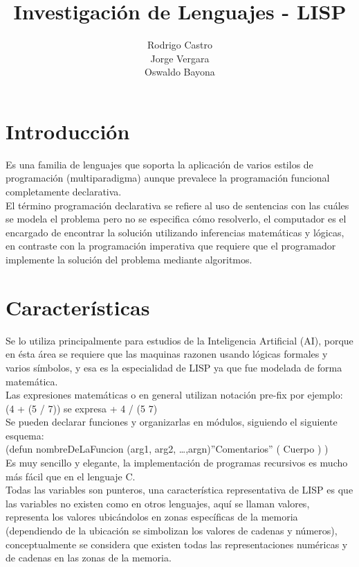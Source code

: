 \documentclass[11pt]{article} %
\title{Investigación de Lenguajes - LISP}
\author{Rodrigo Castro\\Jorge Vergara\\Oswaldo Bayona}
\begin{document}
\maketitle

\section{Introducción}

Es una familia de lenguajes que soporta la aplicación de varios estilos de programación 
(multiparadigma) aunque prevalece la programación funcional completamente declarativa.\\

El término programación declarativa se refiere al uso de sentencias con las cuáles se modela el
problema pero no se especifica cómo resolverlo,  el computador es el encargado de encontrar 
la solución utilizando inferencias matemáticas y lógicas, en contraste con la programación
imperativa que requiere que el programador implemente la  solución del problema mediante
algoritmos.\\

\section{Características}


Se lo utiliza principalmente para estudios de la Inteligencia Artificial (AI), porque en ésta área
se requiere que las maquinas razonen usando lógicas formales y varios símbolos, y esa es la especialidad de LISP
ya que fue modelada de forma matemática.\\


Las expresiones matemáticas o en general utilizan notación pre-fix por ejemplo:\\
(4 + (5 / 7))  se expresa + 4 / (5  7)\\
Se pueden declarar funciones y organizarlas en módulos, siguiendo el siguiente esquema:\\
	(defun nombreDeLaFuncion (arg1, arg2, …,argn)”Comentarios” (  Cuerpo ) )\\
	
Es muy sencillo y elegante, la implementación de programas recursivos es mucho más fácil que en el lenguaje C.\\

Todas las variables son punteros, una característica representativa de LISP es que las variables 
no existen como en otros lenguajes, aquí se llaman valores, representa los valores ubicándolos 
en zonas específicas de la memoria (dependiendo de la ubicación se simbolizan los valores
de cadenas y números), conceptualmente se considera que existen todas las representaciones
numéricas y de cadenas en las zonas de la memoria.\\
\end{document}
